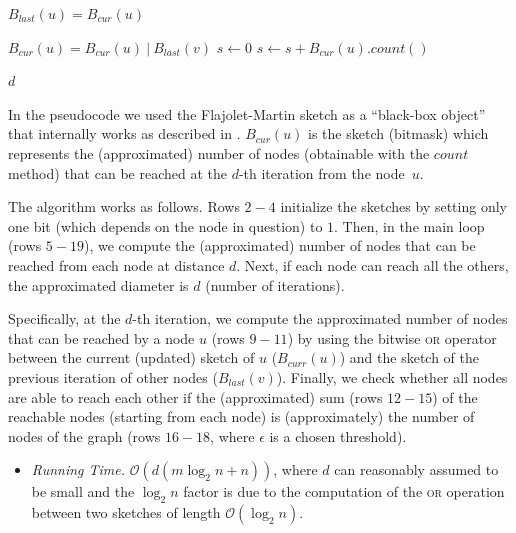 \documentclass[12pt,a4paper]{article}
\begin{document}
\begin{description}
\begin{algorithm}
\begin{algorithmic}[1]
  
      \State $B_{last}(u) = B_{cur}(u)$
    \EndFor
 
    \State $B_{cur}(u) =  B_{cur}(u)\ |\  B_{last}(v)$
    \EndFor
    \State $s \gets 0$
    	\State $s \gets s + B_{cur}(u).count()$
    \EndFor
    
    	\State \Return $d$
    \EndIf
  
  \EndFor
  
\EndFunction

\end{algorithmic}
\end{algorithm}


In the pseudocode we used the Flajolet-Martin sketch as a ``black-box object'' that internally works as described in \cite{flajolet1985probabilistic}. $B_{cur}(u)$ is the sketch (bitmask) which represents the (approximated) number of nodes (obtainable with the $count$ method) that can be reached at the $d$-th iteration from the node~$u$.

The algorithm works as follows. Rows $2-4$ initialize the sketches by setting only one bit (which depends on the node in question) to $1$. Then, in the main loop (rows $5-19$), we compute the (approximated) number of nodes that can be reached from each node at distance $d$. Next, if each node can reach all the others, the approximated diameter is $d$ (number of iterations).

Specifically, at the $d$-th iteration,  we compute the approximated number of nodes that can be reached by a node $u$ (rows $9-11$) by using the bitwise \textsc{or} operator between the current (updated) sketch of $u$ ($B_{curr}(u)$) and the sketch of the previous iteration of other nodes ($B_{last}(v)$). Finally, we check whether all nodes are able to reach each other if the (approximated) sum (rows $12-15$) of the reachable nodes (starting from each node) is (approximately) the number of nodes of the graph (rows $16-18$, where $\epsilon$ is a chosen threshold).

\begin{itemize}
\item \textit{Running Time.} $\mathcal{O}(d(m \log_2 n + n))$, where $d$ can reasonably assumed to be small and the $\log_2 n$ factor is due to the computation of the \textsc{or} operation between two sketches of length $\mathcal{O}(\log_2 n)$.


\end{itemize}
\end{description}
\end{document}
